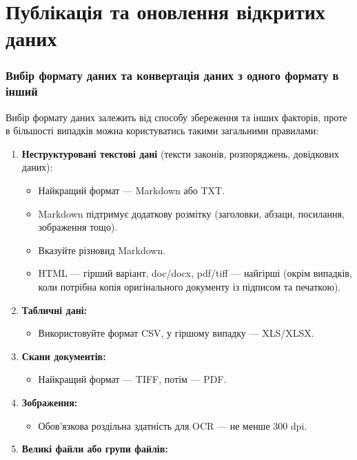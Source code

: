 \chapter{Публікація та оновлення відкритих даних}

\subsection{Вибір формату даних та конвертація даних з одного формату в інший}

Вибір формату даних залежить від способу збереження та інших факторів, проте в більшості випадків можна користуватись такими загальними правилами:

\begin{enumerate}
    \item \textbf{Неструктуровані текстові дані} (тексти законів, розпоряджень, довідкових даних):  
        \begin{itemize}
            \item Найкращий формат — Markdown або TXT.  
            \item Markdown підтримує додаткову розмітку (заголовки, абзаци, посилання, зображення тощо).  
            \item Вказуйте різновид Markdown.  
            \item HTML — гірший варіант, doc/docx, pdf/tiff — найгірші (окрім випадків, коли потрібна копія оригінального документу із підписом та печаткою).
        \end{itemize}
    \item \textbf{Табличні дані:}  
        \begin{itemize}
            \item Використовуйте формат CSV, у гіршому випадку — XLS/XLSX.
        \end{itemize}
    \item \textbf{Скани документів:}  
        \begin{itemize}
            \item Найкращий формат — TIFF, потім — PDF.
        \end{itemize}
    \item \textbf{Зображення:}  
        \begin{itemize}
            \item Обов'язкова роздільна здатність для OCR — не менше 300 dpi.
        \end{itemize}
    \item \textbf{Великі файли або групи файлів:}  

\end{enumerate}
